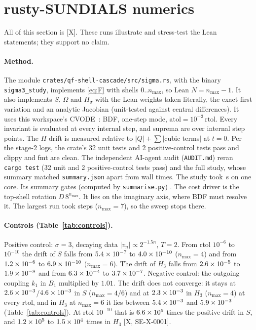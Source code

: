 \documentclass[11pt]{article}
\theoremstyle{remark}
\newcommand{\tier}[1]{\textsf{[#1]}}
\begin{document}
\section{rusty-SUNDIALS numerics}\label{sec:numerics}

All of this section is \tier{X}. These runs illustrate and stress-test the Lean statements; they support no claim.

\paragraph{Method.} The module \texttt{crates/qf-shell-cascade/src/sigma.rs}, with the binary \texttt{sigma3\_study}, implements
\eqref{eq:F} with shells $0..n_{\max}$, so Lean $N=n_{\max}-1$. It also implements $S$, $\Omega$ and $H_\sigma$ with the Lean weights
taken literally, the exact first variation and an analytic Jacobian (unit-tested against central differences). It uses this
workspace's CVODE~\cite{sundials,rusty}: BDF, one-step mode, $\mathrm{atol}=10^{-3}\,\mathrm{rtol}$. Every invariant is
evaluated at every internal step, and suprema are over internal step points. The $H$ drift is measured relative to $|Q|+\sum|$cubic
terms$|$ at $t=0$. Per the stage-2 logs, the crate's 32 unit tests and 2 positive-control tests pass and clippy and fmt are
clean. The independent AI-agent audit (\texttt{AUDIT.md}) reran \texttt{cargo test} (32 unit and 2 positive-control tests
pass) and the full study, whose summary matched \texttt{summary.json} apart from wall times. The study took \TotalWall\,s on one core. Its \NGates{} summary gates (computed by
\texttt{summarise.py}) \AllGates. The cost driver is the top-shell rotation $D\,8^{n_{\max}}$. It lies on the imaginary axis,
where BDF must resolve it. The largest run took \SthreeMaxSteps{} steps
($n_{\max}=7$), so the sweep stops there.

\paragraph{Controls (Table~\ref{tab:controls}).} Positive control: $\sigma=3$, decaying data $|v_n|\propto2^{-1.5n}$, $T=2$.
From rtol $10^{-6}$ to $10^{-10}$ the drift of $S$ falls from $5.4\times10^{-7}$ to $4.0\times10^{-10}$ ($n_{\max}=4$) and from $1.2\times10^{-6}$
to $6.9\times10^{-10}$ ($n_{\max}=6$). The drift of $H_3$ falls from $2.6\times10^{-5}$ to $1.9\times10^{-8}$ and from $6.3\times10^{-4}$ to $3.7\times10^{-7}$.
Negative control: the outgoing coupling $k_1$ in $B_1$ multiplied by $1.01$. The drift does not converge: it stays at
$2.6\times10^{-3}$/$4.6\times10^{-3}$ in $S$ ($n_{\max}=4/6$) and at $2.3\times10^{-3}$ in $H_3$ ($n_{\max}=4$) at every rtol, and in $H_3$ at
$n_{\max}=6$ it lies between $5.4\times10^{-3}$ and $5.9\times10^{-3}$ (Table~\ref{tab:controls}). At rtol $10^{-10}$ that is $6.6\times10^{6}$ times the positive drift in $S$, and
$1.2\times10^{5}$ to $1.5\times10^{4}$ times in $H_3$ \tier{X, SE-X-0001}.
\end{document}
